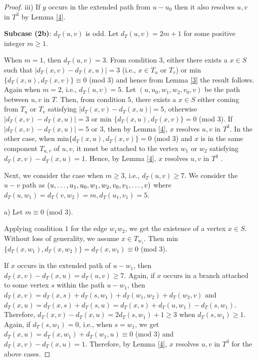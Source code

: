 \documentclass{article}
\theoremstyle{definition}
\numberwithin{equation}{section}
\begin{document}
\begin{proof}
\vspace{0.7em}
\noindent iii) If $y$ occurs in the extended path from $u-u_{0}$ then it also resolves $u,v$ in $T^{3}$ by Lemma \ref{4}.



\vspace{0.7em}
\noindent \textbf{Subcase (2b)}: $d_{T}(u,v)$ is odd. Let $d_{T}(u,v)=2m+1$ for some positive integer $m\geq 1$.

\vspace{0.7em}
When $m=1$, then $d_{T}(u,v)=3$. From condition $3$, either there exists a $x\in S$ such that $|d_{T}(x,v)-d_{T}(x,u)|=3$ (i.e., $x\in T_{u}$ or $T_{v}$) or min$\{d_{T}(x,u),d_{T}(x,v)\}\equiv 0$ (mod $3$) and hence from Lemma \ref{3} the result follows. Again when $m=2$, i.e., $d_{T}(u,v)=5$. Let $(u,u_{0},w_{1},w_{2}, v_{0}, v)$ be the path between $u,v$ in $T$. Then, from  condition $5$, there exists a $x\in S$  either coming from $T_u$ or $T_v$ satisfying $|d_{T}(x,v)-d_{T}(x,u)|=5$, otherwise $|d_{T}(x,v)-d_{T}(x,u)|=3$ or 
 min $\{d_{T}(x,u),d_{T}(x,v)\}=0$ (mod $3$). If $|d_{T}(x,v)-d_{T}(x,u)|=5$ or $3$, then by Lemma \ref{4}, $x$ resolves $u,v$ in $T^{3}$. In the other case, when min$\{d_{T}(x,u),d_{T}(x,v)\}=0$ (mod $3$) and $x$ is in the same component $T_{u,v}$ of $u,v$, it must be attached to the vertex $w_{1}$ or $w_{2}$ satisfying $d_{T}(x,v)-d_{T}(x,u)=1$. Hence, by Lemma \ref{4}, $x$ resolves $u,v$ in $T^{3}$ .

\vspace{0.7em}
Next, we consider the case when $m\geq 3$, i.e., $d_{T}(u,v)\geq 7$. We consider  the $u-v$ path as $(u,\hdots, u_{1},u_{0},w_{1},w_{2},v_{0},\\
v_{1},\hdots, v)$ where $d_{T}(u,w_{1})=d_{T}(v,w_{2})=m, d_{T}(u_{1},v_{1})=5$.

\vspace{0.7em}
\noindent a) Let $m\equiv 0$ (mod $3$).
\vspace{0.3em}

Applying condition $1$ for the edge $w_{1}w_{2}$, we get the existence of a vertex $x\in S$. Without loss of generality, we assume $x\in T_{w_{1}}$. Then min$\{d_{T}(x,w_{1}),d_{T}(x,w_{2})\}=d_{T}(x,w_{1})\equiv 0$ (mod $3$). 
 
\vspace{0.3em}
If $x$ occurs in the extended path of $u-w_{1}$, then $d_{T}(x,v)-d_{T}(x,u)=d_{T}(u,v)\geq 7$. Again, if $x$ occurs in a branch attached to some vertex $s$ within the path $u-w_{1}$, then $d_{T}(x,v)=d_{T}(x,s)+d_{T}(s,w_{1})+d_{T}(w_{1},w_{2})+d_{T}(w_{2},v)$ and $d_{T}(x,u)=d_{T}(x,s)+d_{T}(s,u)=d_{T}(x,s)+d_{T}(u,w_{1})-d_{T}(s,w_{1})$. 
Therefore, $d_{T}(x,v)-d_{T}(x,u)=2d_{T}(s,w_{1})+1\geq 3$ when $d_{T}(s,w_{1})\geq 1$. Again, if $d_{T}(s,w_{1})=0$, i.e., when $s=w_{1}$,  we get $d_{T}(x,u)=d_{T}(x,w_{1})+d_{T}(w_{1},u)\equiv 0$ (mod $3$) and $d_{T}(x,v)-d_{T}(x,u)=1$. Therefore, by Lemma \ref{4}, $x$ resolves $u,v$ in $T^{3}$ for the above cases.


\end{proof}
\end{document}

